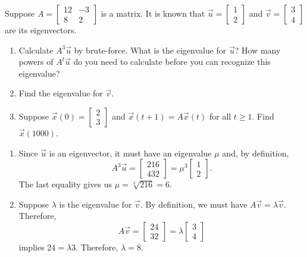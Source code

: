 \documentclass[../main.tex]{subfiles}
\begin{document}
\begin{exercise}
  Suppose \(A = \begin{bmatrix} 12 & -3  \\ 8 & 2 \end{bmatrix}\) is a matrix.  It is known that \(\vec{u} = \begin{bmatrix} 1 \\ 2 \end{bmatrix}\) and \(\vec{v} = \begin{bmatrix} 3 \\ 4 \end{bmatrix}\) are its eigenvectors.

  \begin{enumerate}
    \item Calculate \(A^{3}\vec{u}\) by brute-force. What is the eigenvalue for \(\vec{u}\)? How many powers of \(A^{t}\vec{u}\) do you need to calculate before you can recognize this eigenvalue?
    \item Find the eigenvalue for \(\vec{v}\).
    \item Suppose \(\vec{x}(0) = \begin{bmatrix} 2 \\ 3 \end{bmatrix}\) and \(\vec{x}(t+1) = A \vec{x}(t)\) for all \(t \ge 1\). Find \(\vec{x}(1000)\).
  \end{enumerate}

  \begin{solution} \phantom{top}
    \begin{enumerate}
      \item Since \(\vec{u}\) is an eigenvector, it must have an eigenvalue \(\mu\) and, by definition, \[A^{3} \vec{u} = \begin{bmatrix} 216 \\ 432\end{bmatrix} = \mu^{3} \begin{bmatrix} 1 \\ 2 \end{bmatrix}.\] The last equality gives us \(\mu = \sqrt[3]{216} = 6\).
        
      \item Suppose \(\lambda\) is the eigenvalue for \(\vec{v}\). By definition, we must have \(A \vec{v} = \lambda \vec{v}\). Therefore, 
        \[
          A \vec{v} = \begin{bmatrix} 24 \\ 32 \end{bmatrix} = \lambda \begin{bmatrix} 3 \\ 4 \end{bmatrix}
        \]
        implies \(24 = \lambda 3\). Therefore, \(\lambda = 8\).


\end{enumerate}
\end{solution}
\end{exercise}
\end{document}
